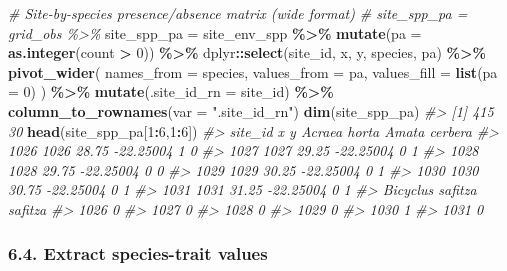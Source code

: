 \documentclass[
]{article}
\newenvironment{Shaded}{\begin{snugshade}}{\end{snugshade}}
\newcommand{\AttributeTok}[1]{\textcolor[rgb]{0.13,0.29,0.53}{#1}}
\newcommand{\CommentTok}[1]{\textcolor[rgb]{0.56,0.35,0.01}{\textit{#1}}}
\newcommand{\DecValTok}[1]{\textcolor[rgb]{0.00,0.00,0.81}{#1}}
\newcommand{\FunctionTok}[1]{\textcolor[rgb]{0.13,0.29,0.53}{\textbf{#1}}}
\newcommand{\NormalTok}[1]{#1}
\newcommand{\OtherTok}[1]{\textcolor[rgb]{0.56,0.35,0.01}{#1}}
\newcommand{\SpecialCharTok}[1]{\textcolor[rgb]{0.81,0.36,0.00}{\textbf{#1}}}
\newcommand{\StringTok}[1]{\textcolor[rgb]{0.31,0.60,0.02}{#1}}
\begin{document}
\begin{Shaded}
\begin{Highlighting}[]
\CommentTok{\# Site{-}by{-}species presence/absence matrix (wide format)}
\CommentTok{\# site\_spp\_pa = grid\_obs \%\textgreater{}\%}
\NormalTok{site\_spp\_pa }\OtherTok{=}\NormalTok{ site\_env\_spp }\SpecialCharTok{\%\textgreater{}\%} 
  \FunctionTok{mutate}\NormalTok{(}\AttributeTok{pa =} \FunctionTok{as.integer}\NormalTok{(count }\SpecialCharTok{\textgreater{}} \DecValTok{0}\NormalTok{)) }\SpecialCharTok{\%\textgreater{}\%}
\NormalTok{  dplyr}\SpecialCharTok{::}\FunctionTok{select}\NormalTok{(site\_id, x, y, species, pa) }\SpecialCharTok{\%\textgreater{}\%}
  \FunctionTok{pivot\_wider}\NormalTok{(}
    \AttributeTok{names\_from  =}\NormalTok{ species,}
    \AttributeTok{values\_from =}\NormalTok{ pa,}
    \AttributeTok{values\_fill =} \FunctionTok{list}\NormalTok{(}\AttributeTok{pa =} \DecValTok{0}\NormalTok{)}
\NormalTok{  ) }\SpecialCharTok{\%\textgreater{}\%}
  \FunctionTok{mutate}\NormalTok{(}\AttributeTok{.site\_id\_rn =}\NormalTok{ site\_id) }\SpecialCharTok{\%\textgreater{}\%}
  \FunctionTok{column\_to\_rownames}\NormalTok{(}\AttributeTok{var =} \StringTok{".site\_id\_rn"}\NormalTok{)}
\FunctionTok{dim}\NormalTok{(site\_spp\_pa)}
\CommentTok{\#\textgreater{} [1] 415  30}
\FunctionTok{head}\NormalTok{(site\_spp\_pa[}\DecValTok{1}\SpecialCharTok{:}\DecValTok{6}\NormalTok{,}\DecValTok{1}\SpecialCharTok{:}\DecValTok{6}\NormalTok{])}
\CommentTok{\#\textgreater{}      site\_id     x         y Acraea horta Amata cerbera}
\CommentTok{\#\textgreater{} 1026    1026 28.75 {-}22.25004            1             0}
\CommentTok{\#\textgreater{} 1027    1027 29.25 {-}22.25004            0             1}
\CommentTok{\#\textgreater{} 1028    1028 29.75 {-}22.25004            0             0}
\CommentTok{\#\textgreater{} 1029    1029 30.25 {-}22.25004            0             1}
\CommentTok{\#\textgreater{} 1030    1030 30.75 {-}22.25004            0             1}
\CommentTok{\#\textgreater{} 1031    1031 31.25 {-}22.25004            0             1}
\CommentTok{\#\textgreater{}      Bicyclus safitza safitza}
\CommentTok{\#\textgreater{} 1026                        0}
\CommentTok{\#\textgreater{} 1027                        0}
\CommentTok{\#\textgreater{} 1028                        0}
\CommentTok{\#\textgreater{} 1029                        0}
\CommentTok{\#\textgreater{} 1030                        1}
\CommentTok{\#\textgreater{} 1031                        0}
\end{Highlighting}
\end{Shaded}

\hypertarget{extract-species-trait-values}{%
\subsubsection{\texorpdfstring{6.4. Extract \textbf{species-trait}
values}{6.4. Extract species-trait values}}\label{extract-species-trait-values}}
\end{document}
